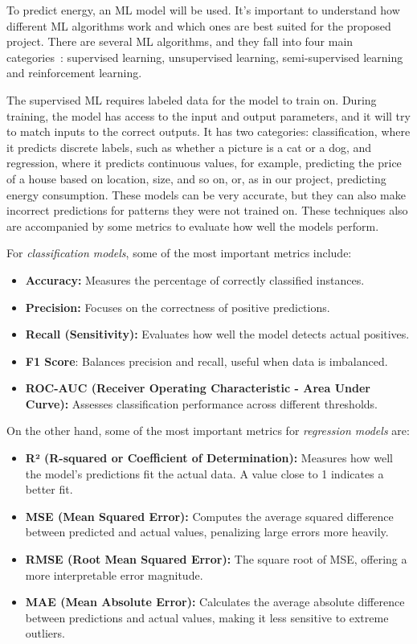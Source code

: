 To predict energy, an ML model will be used. It's important to understand how different ML algorithms work and which ones are best suited for the proposed project. There are several ML algorithms, and they fall into four main categories~\cite{sarker2021machine}: supervised learning, unsupervised learning, semi-supervised learning and reinforcement learning.

The supervised ML requires labeled data for the model to train on. During training, the model has access to the input and output parameters, and it will try to match inputs to the correct outputs. It has two categories: classification, where it predicts discrete labels, such as whether a picture is a cat or a dog, and regression, where it predicts continuous values, for example, predicting the price of a house based on location, size, and so on, or, as in our project, predicting energy consumption. These models can be very accurate, but they can also make incorrect predictions for patterns they were not trained on. These techniques also are accompanied by some metrics to evaluate how well the models perform.



For \textit{classification models}, some of the most important metrics include:
\begin{itemize}
    \item \textbf{Accuracy:} Measures the percentage of correctly classified instances.
    \item \textbf{Precision:} Focuses on the correctness of positive predictions.
    \item \textbf{Recall (Sensitivity):} Evaluates how well the model detects actual positives.
    \item \textbf{F1 Score}: Balances precision and recall, useful when data is imbalanced.
    \item \textbf{ROC-AUC (Receiver Operating Characteristic - Area Under Curve):} Assesses classification performance across different thresholds.
\end{itemize}

On the other hand, some of the most important metrics for \textit{regression models} are:
\begin{itemize}
    \item \textbf{R² (R-squared or Coefficient of Determination):} Measures how well the model's predictions fit the actual data. A value close to 1 indicates a better fit.
    \item \textbf{MSE (Mean Squared Error):} Computes the average squared difference between predicted and actual values, penalizing large errors more heavily.
    \item \textbf{RMSE (Root Mean Squared Error):} The square root of MSE, offering a more interpretable error magnitude.
    \item \textbf{MAE (Mean Absolute Error):} Calculates the average absolute difference between predictions and actual values, making it less sensitive to extreme outliers.
\end{itemize}


